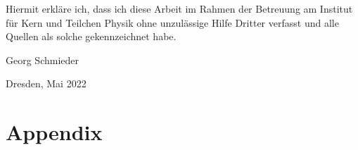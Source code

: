 \clearpage
\thispagestyle{empty}
\vspace*{1.5em}

Hiermit erkläre ich, dass ich diese Arbeit im Rahmen der Betreuung am Institut
für Kern und Teilchen Physik ohne unzulässige Hilfe Dritter verfasst und alle Quellen als solche gekennzeichnet habe.

\vspace*{45em}

Georg Schmieder \par
Dresden, Mai 2022

\chapter{Appendix}
\label{sec:appendix}


